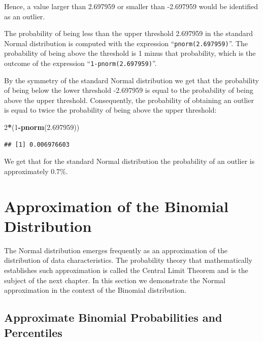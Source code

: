 \documentclass[
]{krantz}
\makeatletter
\newenvironment{Shaded}{\begin{snugshade}}{\end{snugshade}}
\newcommand{\DecValTok}[1]{\textcolor[rgb]{0.00,0.00,0.81}{#1}}
\newcommand{\FloatTok}[1]{\textcolor[rgb]{0.00,0.00,0.81}{#1}}
\newcommand{\KeywordTok}[1]{\textcolor[rgb]{0.13,0.29,0.53}{\textbf{#1}}}
\newcommand{\NormalTok}[1]{#1}
\newcommand{\OperatorTok}[1]{\textcolor[rgb]{0.81,0.36,0.00}{\textbf{#1}}}
\newenvironment{kframe}{%
\medskip{}
\setlength{\fboxsep}{.8em}
 \def\at@end@of@kframe{}%
 \ifinner\ifhmode%
  \def\at@end@of@kframe{\end{minipage}}%
  \begin{minipage}{\columnwidth}%
 \fi\fi%
 \def\FrameCommand##1{\hskip\@totalleftmargin \hskip-\fboxsep
 \colorbox{shadecolor}{##1}\hskip-\fboxsep
     \hskip-\linewidth \hskip-\@totalleftmargin \hskip\columnwidth}%
 \MakeFramed {\advance\hsize-\width
   \@totalleftmargin\z@ \linewidth\hsize
   \@setminipage}}%
 {\par\unskip\endMakeFramed%
 \at@end@of@kframe}
\renewenvironment{Shaded}{\begin{kframe}}{\end{kframe}}
\theoremstyle{definition}
\theoremstyle{definition}
\theoremstyle{definition}
\theoremstyle{remark}
\makeatother
\begin{document}
Hence, a value larger than 2.697959 or smaller than -2.697959 would be
identified as an outlier.

The probability of being less than the upper threshold 2.697959 in the
standard Normal distribution is computed with the expression
``\texttt{pnorm(2.697959)}''. The probability of being above the threshold is 1
minus that probability, which is the outcome of the expression
``\texttt{1-pnorm(2.697959)}''.

By the symmetry of the standard Normal distribution we get that the
probability of being below the lower threshold -2.697959 is equal to the
probability of being above the upper threshold. Consequently, the
probability of obtaining an outlier is equal to twice the probability of
being above the upper threshold:

\begin{Shaded}
\begin{Highlighting}[]
\DecValTok{2}\OperatorTok{*}\NormalTok{(}\DecValTok{1}\OperatorTok{-}\KeywordTok{pnorm}\NormalTok{(}\FloatTok{2.697959}\NormalTok{))}
\end{Highlighting}
\end{Shaded}

\begin{verbatim}
## [1] 0.006976603
\end{verbatim}

We get that for the standard Normal distribution the probability of an
outlier is approximately 0.7\%.

\hypertarget{approximation-of-the-binomial-distribution}{%
\section{Approximation of the Binomial Distribution}\label{approximation-of-the-binomial-distribution}}

The Normal distribution emerges frequently as an approximation of the
distribution of data characteristics. The probability theory that
mathematically establishes such approximation is called the Central
Limit Theorem and is the subject of the next chapter. In this section we
demonstrate the Normal approximation in the context of the Binomial
distribution.

\hypertarget{approximate-binomial-probabilities-and-percentiles}{%
\subsection{Approximate Binomial Probabilities and Percentiles}\label{approximate-binomial-probabilities-and-percentiles}}
\end{document}
